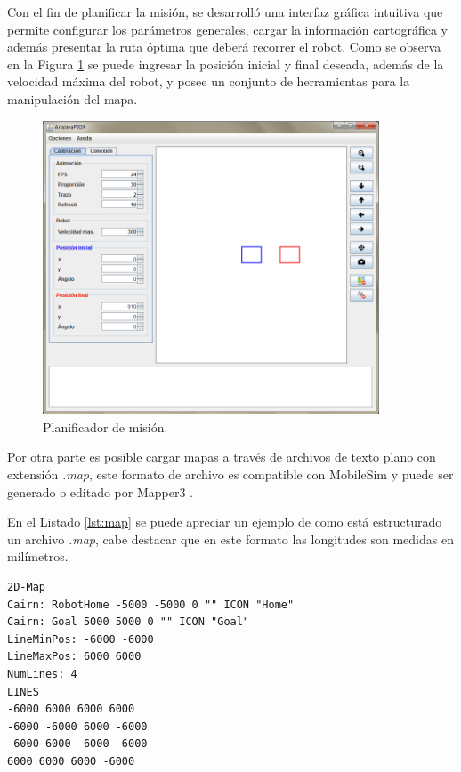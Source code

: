 \documentclass[11pt,twoside,A5]{article}
\newcommand{\reflistings}[1]{Listado \ref{#1}}
\newcommand{\reffigure}[1]{Figura \ref{#1}}
\begin{document}
Con el fin de planificar la misión, se desarrolló una interfaz gráfica intuitiva que permite configurar
los parámetros generales, cargar la información cartográfica y además presentar la ruta óptima que deberá recorrer el robot. 
Como se observa en la \reffigure{fig:planificador} se puede ingresar la posición inicial y final deseada, además de la velocidad máxima del robot, 
y posee un conjunto de herramientas para la manipulación del mapa.

\begin{figure}[here]
\begin{center}
\includegraphics[width=10cm]{ventana-principal.png} 
\caption{Planificador de misión.}
\label{fig:planificador}
\end{center}
\end{figure} 

Por otra parte es posible cargar mapas a través de archivos de texto plano con extensión \textit{.map}, 
este formato de archivo es compatible con MobileSim y puede ser generado o editado por
Mapper3 \cite{mapper2014}.

En el \reflistings{lst:map} se puede apreciar un ejemplo de como está estructurado un archivo \textit{.map},
cabe destacar que en este formato las longitudes son medidas en milímetros.

\begin{minipage}{\linewidth}
\begin{lstlisting}[caption={Ejemplo archivo mapa.}, label=lst:map]
2D-Map
Cairn: RobotHome -5000 -5000 0 "" ICON "Home"
Cairn: Goal 5000 5000 0 "" ICON "Goal" 
LineMinPos: -6000 -6000
LineMaxPos: 6000 6000
NumLines: 4
LINES
-6000 6000 6000 6000
-6000 -6000 6000 -6000
-6000 6000 -6000 -6000
6000 6000 6000 -6000
\end{lstlisting}
\end{minipage}
\end{document}
